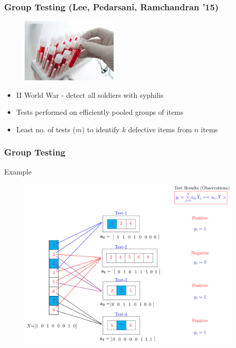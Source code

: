 
\begin{frame}
	\frametitle{Group Testing (Lee, Pedarsani, Ramchandran '15)}
	\begin{figure}[t]
		\centering
		\includegraphics[width=1.8in]{./Figures/grouptest_testubes.jpg}
	\end{figure}

\begin{itemize}
	\item II World War - detect all soldiers with syphilis
	\item Tests performed on efficiently pooled groups of items
	\item Least no. of tests ($m$) to identify $k$ defective items from $n$ items
\end{itemize}	

\end{frame}
\begin{frame}\frametitle{Group Testing}

\alert{Example}
\vspace{-0.3in}
	\begin{figure}[t]
		\centering
		\includegraphics[width=4.2in]{./Figures/grouptesting_example.pdf}
	\end{figure}

\end{frame}


